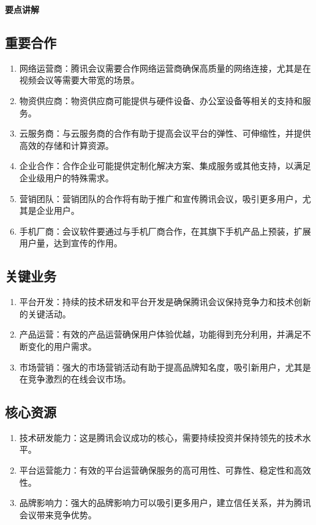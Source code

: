 \documentclass[a4paper,12pt]{article}
\begin{document}
    \textbf{要点讲解}
    \subsection{重要合作}
    \begin{enumerate}
        \item 网络运营商：腾讯会议需要合作网络运营商确保高质量的网络连接，尤其是在视频会议等需要大带宽的场景。
        \item 物资供应商：物资供应商可能提供与硬件设备、办公室设备等相关的支持和服务。
        \item 云服务商：与云服务商的合作有助于提高会议平台的弹性、可伸缩性，并提供高效的存储和计算资源。
        \item 企业合作：合作企业可能提供定制化解决方案、集成服务或其他支持，以满足企业级用户的特殊需求。
        \item 营销团队：营销团队的合作将有助于推广和宣传腾讯会议，吸引更多用户，尤其是企业用户。
        \item 手机厂商：会议软件要通过与手机厂商合作，在其旗下手机产品上预装，扩展用户量，达到宣传的作用。
    \end{enumerate}

    \subsection{关键业务}
    \begin{enumerate}
        \item 平台开发：持续的技术研发和平台开发是确保腾讯会议保持竞争力和技术创新的关键活动。
        \item 产品运营：有效的产品运营确保用户体验优越，功能得到充分利用，并满足不断变化的用户需求。
        \item 市场营销：强大的市场营销活动有助于提高品牌知名度，吸引新用户，尤其是在竞争激烈的在线会议市场。
    \end{enumerate}

    \subsection{核心资源}
    \begin{enumerate}
        \item 技术研发能力：这是腾讯会议成功的核心，需要持续投资并保持领先的技术水平。
        \item 平台运营能力：有效的平台运营确保服务的高可用性、可靠性、稳定性和高效性。
        \item 品牌影响力：强大的品牌影响力可以吸引更多用户，建立信任关系，并为腾讯会议带来竞争优势。
    \end{enumerate}
\end{document}
